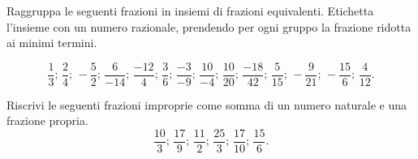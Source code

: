 \subsubsection*{}

\begin{esercizio}
 \label{ese:3.17}
Raggruppa le seguenti frazioni in insiemi di frazioni equivalenti.
Etichetta l'insieme con un numero razionale, prendendo per ogni gruppo la 
frazione ridotta ai minimi termini.

\[\frac{1}{3};\,\frac{2}{4};\,-\frac{5}{2};\,\frac{6}{-14};\,\frac{-12}{4};\,
\frac{3}{6};\,\frac{-3}{-9};\,
\frac{10}{-4};\,\frac{10}{20};\,\frac{-18}{42};\,\frac{5}{15};\,
-\frac{9}{21};\,-\frac{15}{6};\,\frac{4}{12}.\]
\end{esercizio}

\begin{esercizio}
 \label{ese:3.18}
 Riscrivi le seguenti frazioni improprie come somma di un numero naturale e 
 una frazione propria.
\[\frac{10}{3};\,\frac{17}{9};\,\frac{11}{2};\,\frac{25}{3};\,\frac{17}{10};\,
\frac{15}{6}.\]
\end{esercizio}

\subsubsection*{}

